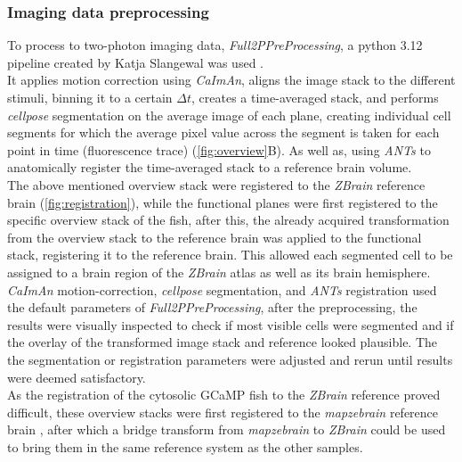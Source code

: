 \documentclass[12pt, a4paper, oneside]{article}
\begin{document}
\subsubsection{Imaging data preprocessing}
\label{sec:image preproc}
To process to two-photon imaging data, \textit{Full2PPreProcessing}, a python 3.12 pipeline created by Katja Slangewal was used \parencite{slangewalMultifeatureVisualProcessing2026}.\\
It applies motion correction using \textit{CaImAn}, aligns the image stack to the different stimuli, binning it to a certain $\Delta t$, creates a time-averaged stack, and performs \textit{cellpose} segmentation \parencite{pachitariuCellposeSAMSuperhumanGeneralization2025} on the average image of each plane, creating individual cell segments for which the average pixel value across the segment is taken for each point in time (fluorescence trace) (\autoref{fig:overview}B). As well as, using \textit{ANTs} to anatomically register the time-averaged stack to a reference brain volume.\\
The above mentioned overview stack were registered to the \textit{ZBrain} reference brain \parencite{randlettWholebrainActivityMapping2015} (\autoref{fig:registration}), while the functional planes were first registered to the specific overview stack of the fish, after this, the already acquired transformation from the overview stack to the reference brain was applied to the functional stack, registering it to the reference brain. This allowed each segmented cell to be assigned to a brain region of the \textit{ZBrain} atlas as well as its brain hemisphere.\\
\textit{CaImAn} \parencite{giovannucciCaImAnOpenSource2019} motion-correction, \textit{cellpose} segmentation, and \textit{ANTs} registration used the default parameters of \textit{Full2PPreProcessing}, after the preprocessing, the results were visually inspected to check if most visible cells were segmented and if the overlay of the transformed image stack and reference looked plausible. The the segmentation or registration parameters were adjusted and rerun until results were deemed satisfactory.\\
As the registration of the cytosolic GCaMP fish to the \textit{ZBrain} reference proved difficult, these overview stacks were first registered to the \textit{mapzebrain} reference brain \parencite{kunstCellularResolutionAtlasLarval2019, MapZebrain}, after which a bridge transform from \textit{mapzebrain} to \textit{ZBrain} could be used to bring them in the same reference system as the other samples.\\
\end{document}
